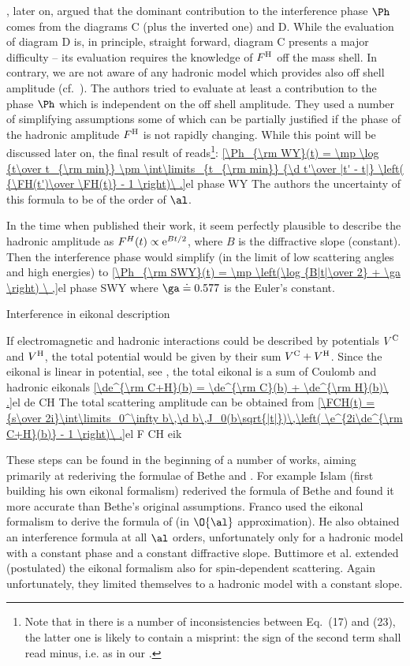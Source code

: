 \WY, later on, argued that the dominant contribution to the interference phase $\Ph$ comes from the diagrams  C (plus the inverted one) and D. While the evaluation of diagram D is, in principle, straight forward, diagram C presents a major difficulty -- its evaluation requires the knowledge of $F^{\rm H}$ off the mass shell. In contrary, we are not aware of any hadronic model which provides also off shell amplitude (cf.~). The authors tried to evaluate at least a contribution to the phase $\Ph$ which is independent on the off shell amplitude. They used a number of simplifying assumptions some of which can be partially justified if the phase of the hadronic amplitude $F^{\rm H}$ is not rapidly changing. While this point will be discussed later on, the final result of \WY{} reads\footnote{%
Note that in  there is a number of inconsistencies between Eq.~(17) and (23), the latter one is likely to contain a misprint: the sign of the second term shall read minus, i.e. as in our .
}:
\eqref{\Ph_{\rm WY}(t) = \mp \log {t\over t_{\rm min}} \pm \int\limits_{t_{\rm min}} {\d t'\over |t' - t|} \left( {\FH(t')\over \FH(t)} - 1 \right)\ .}{el phase WY}
The authors the uncertainty of this formula to be of the order of $\al$.

In the time when \WY{} published their work, it seem perfectly plausible to describe the hadronic amplitude as $F^H(t) \propto {\rm e}^{Bt/2}$, where $B$ is the diffractive slope (constant). Then the interference phase would simplify (in the limit of low scattering angles and high energies) to
\eqref{\Ph_{\rm SWY}(t) = \mp \left(\log {B|t|\over 2} + \ga \right) \ ,}{el phase SWY}
where $\ga \doteq 0.577$ is the Euler's constant.



\caption{Interference in eikonal description}

If electromagnetic and hadronic interactions could be described by potentials $V^{\rm C}$ and $V^{\rm H}$, the total potential would be given by their sum $V^{\rm C} + V^{\rm H}$. Since the eikonal is linear in potential, see , the total eikonal is a sum of Coulomb and hadronic eikonals
\eqref{\de^{\rm C+H}(b) = \de^{\rm C}(b) + \de^{\rm H}(b)\ .}{el de CH}
The total scattering amplitude can be obtained from 
\eqref{\FCH(t) = {s\over 2i}\int\limits_0^\infty b\,\d b\,J_0(b\sqrt{|t|})\,\left( \e^{2i\de^{\rm C+H}(b)} - 1 \right)\ .}{el F CH eik}

These steps can be found in the beginning of a number of works, aiming primarily at rederiving the formulae of Bethe  and \WY{} .
  For example Islam  (first building his own eikonal formalism) rederived the formula of Bethe and found it more accurate than Bethe's original assumptions.
  Franco  used the eikonal formalism to derive the formula of \WY{} (in $\O{\al}$ approximation). He also obtained an interference formula at all $\al$ orders, unfortunately only for a hadronic model with a constant phase and a constant diffractive slope.
  Buttimore et al.  extended (postulated) the eikonal formalism also for spin-dependent scattering. Again unfortunately, they limited themselves to a hadronic model with a constant slope.

